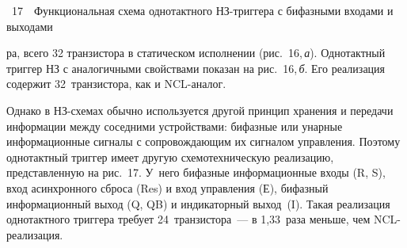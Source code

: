 \begin{multicols}{2}
\noindent
{{\figurename~17}\ \ \small{Функциональная схема однотактного НЗ-триг\-ге\-ра с бифазными входами и 
выходами}}

\vspace*{12pt}

      

\addtocounter{figure}{1}



\noindent 
ра, всего 32 транзистора в статическом исполнении
(рис.~16,\,\textit{а}).  Однотактный триггер НЗ с аналогичными свойствами показан на 
рис.~16,\,\textit{б}. Его 
реализация содержит 32~транзистора, как и NCL-аналог.




       Однако в НЗ-схемах обычно используется другой принцип хранения и передачи 
информации между соседними устройствами: бифазные или унарные информационные 
сигналы с сопровождающим их сигналом управления. Поэтому однотактный триггер имеет 
другую схемотехническую реализацию, представленную на рис.~17. У~него бифазные 
информационные входы (R, S), вход асинхронного сброса (Res) и вход управления (Е), 
бифазный информационный выход (Q, QB) и индикаторный выход~(I). Такая реализация 
однотактного триггера требует 24~транзистора~--- в 1,33~раза меньше, чем 
       NCL-реа\-ли\-зация.
       
       \begin{figure*} %
   \vspace*{3pt}
 \begin{center}
 \mbox{%
 \epsfxsize=155.898mm
 }
 \end{center}
 \vspace*{-12pt}
\end{figure*}
 \begin{figure*} %
          \vspace*{1pt}
 \begin{center}
 \mbox{%
 \epsfxsize=143.5mm
 }
 \end{center}
 \vspace*{-9pt}
       \end{figure*}
       
          \begin{figure*} %
      \vspace*{1pt}
 \begin{center}
 \mbox{%
 \epsfxsize=153.254mm
 }
 \end{center}
 \vspace*{-9pt}
\end{figure*}


\end{multicols}
